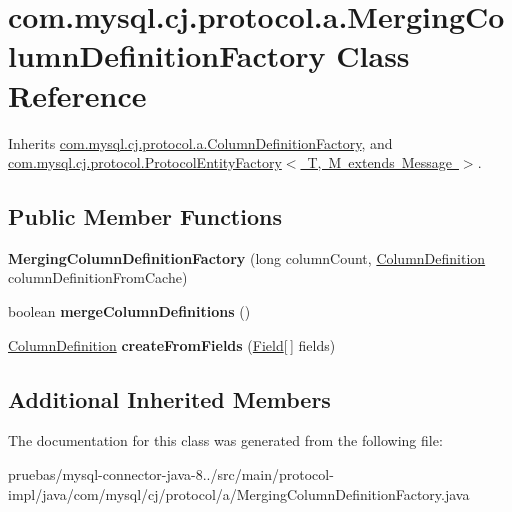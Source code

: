 \hypertarget{classcom_1_1mysql_1_1cj_1_1protocol_1_1a_1_1_merging_column_definition_factory}{}\section{com.\+mysql.\+cj.\+protocol.\+a.\+Merging\+Column\+Definition\+Factory Class Reference}
\label{classcom_1_1mysql_1_1cj_1_1protocol_1_1a_1_1_merging_column_definition_factory}


Inherits \mbox{\hyperlink{classcom_1_1mysql_1_1cj_1_1protocol_1_1a_1_1_column_definition_factory}{com.\+mysql.\+cj.\+protocol.\+a.\+Column\+Definition\+Factory}}, and \mbox{\hyperlink{interfacecom_1_1mysql_1_1cj_1_1protocol_1_1_protocol_entity_factory}{com.\+mysql.\+cj.\+protocol.\+Protocol\+Entity\+Factory$<$ T, M extends Message $>$}}.

\subsection*{Public Member Functions}
\begin{DoxyCompactItemize}
\item 
\mbox{\label{classcom_1_1mysql_1_1cj_1_1protocol_1_1a_1_1_merging_column_definition_factory_aaf619ede06b3b2f48c6d760419a04d9a}} 
{\bfseries Merging\+Column\+Definition\+Factory} (long column\+Count, \mbox{\hyperlink{interfacecom_1_1mysql_1_1cj_1_1protocol_1_1_column_definition}{Column\+Definition}} column\+Definition\+From\+Cache)
\item 
\mbox{\label{classcom_1_1mysql_1_1cj_1_1protocol_1_1a_1_1_merging_column_definition_factory_ae2d954cccdfe76f992318754af511d61}} 
boolean {\bfseries merge\+Column\+Definitions} ()
\item 
\mbox{\label{classcom_1_1mysql_1_1cj_1_1protocol_1_1a_1_1_merging_column_definition_factory_adf331127184c6503a1f3daed6948be05}} 
\mbox{\hyperlink{interfacecom_1_1mysql_1_1cj_1_1protocol_1_1_column_definition}{Column\+Definition}} {\bfseries create\+From\+Fields} (\mbox{\hyperlink{classcom_1_1mysql_1_1cj_1_1result_1_1_field}{Field}}\mbox{[}$\,$\mbox{]} fields)
\end{DoxyCompactItemize}
\subsection*{Additional Inherited Members}


The documentation for this class was generated from the following file\+:\begin{DoxyCompactItemize}
\item 
pruebas/mysql-\/connector-\/java-\/8../src/main/protocol-\/impl/java/com/mysql/cj/protocol/a/Merging\+Column\+Definition\+Factory.\+java\end{DoxyCompactItemize}
